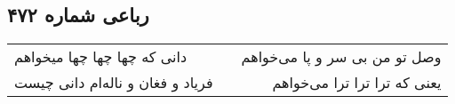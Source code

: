 \begin{center}
\section*{رباعی شماره ۴۷۲}
\label{sec:sh472}
\begin{longtable}{l p{0.5cm} r}
دانی که چها چها چها میخواهم
&&
وصل تو من بی سر و پا می‌خواهم
\\
فریاد و فغان و ناله‌ام دانی چیست
&&
یعنی که ترا ترا ترا می‌خواهم
\\
\end{longtable}
\end{center}
